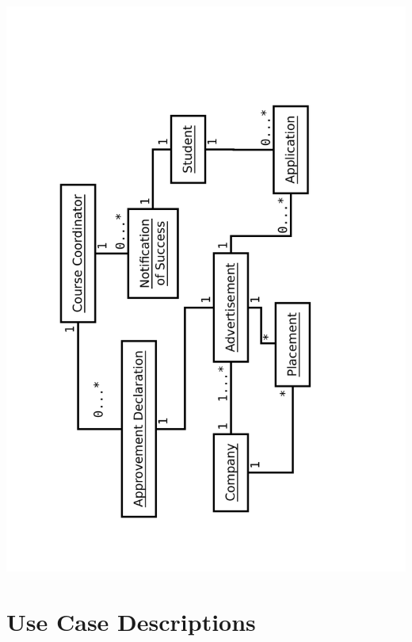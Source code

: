 \documentclass{l3deliverable}
\begin{document}
\includegraphics[scale=0.5,angle=-90]{Domain.pdf}


\section{Use Case Descriptions}


\end{document}
